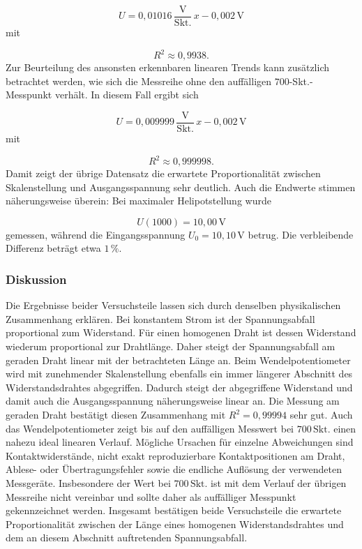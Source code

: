 \documentclass{report}
\begin{document}
\begin{equation}
U
=
0{,}01016\,\frac{\mathrm{V}}{\mathrm{Skt.}}\,x
-
0{,}002\,\mathrm{V}
\end{equation}
\noindent
mit

\begin{equation}
R^2\approx0{,}9938.
\end{equation}
\noindent
Zur Beurteilung des ansonsten erkennbaren linearen Trends kann zusätzlich
betrachtet werden, wie sich die Messreihe ohne den auffälligen
$700$-Skt.-Messpunkt verhält. In diesem Fall ergibt sich

\begin{equation}
U
=
0{,}009999\,\frac{\mathrm{V}}{\mathrm{Skt.}}\,x
-
0{,}002\,\mathrm{V}
\end{equation}
\noindent
mit

\begin{equation}
R^2\approx0{,}999998.
\end{equation}
\noindent
Damit zeigt der übrige Datensatz die erwartete Proportionalität zwischen
Skalenstellung und Ausgangsspannung sehr deutlich.
\noindent
Auch die Endwerte stimmen näherungsweise überein: Bei maximaler
Helipotstellung wurde

\begin{equation}
U(1000)=10{,}00\,\mathrm{V}
\end{equation}
\noindent
gemessen, während die Eingangsspannung $U_0=10{,}10\,\mathrm{V}$ betrug.
Die verbleibende Differenz beträgt etwa $1\,\%$.


\subsubsection{Diskussion}
\noindent
Die Ergebnisse beider Versuchsteile lassen sich durch denselben physikalischen
Zusammenhang erklären. Bei konstantem Strom ist der Spannungsabfall proportional
zum Widerstand. Für einen homogenen Draht ist dessen Widerstand wiederum
proportional zur Drahtlänge. Daher steigt der Spannungsabfall am geraden Draht
linear mit der betrachteten Länge an.
\noindent
Beim Wendelpotentiometer wird mit zunehmender Skalenstellung ebenfalls ein
immer längerer Abschnitt des Widerstandsdrahtes abgegriffen. Dadurch steigt
der abgegriffene Widerstand und damit auch die Ausgangsspannung näherungsweise
linear an.
\noindent
Die Messung am geraden Draht bestätigt diesen Zusammenhang mit
$R^2=0{,}99994$ sehr gut. Auch das Wendelpotentiometer zeigt bis auf den
auffälligen Messwert bei $700\,\mathrm{Skt.}$ einen nahezu ideal linearen
Verlauf.
\noindent
Mögliche Ursachen für einzelne Abweichungen sind Kontaktwiderstände,
nicht exakt reproduzierbare Kontaktpositionen am Draht, Ablese- oder
Übertragungsfehler sowie die endliche Auflösung der verwendeten Messgeräte.
Insbesondere der Wert bei $700\,\mathrm{Skt.}$ ist mit dem Verlauf der
übrigen Messreihe nicht vereinbar und sollte daher als auffälliger Messpunkt
gekennzeichnet werden.
\noindent
Insgesamt bestätigen beide Versuchsteile die erwartete Proportionalität
zwischen der Länge eines homogenen Widerstandsdrahtes und dem an diesem
Abschnitt auftretenden Spannungsabfall.
\end{document}
